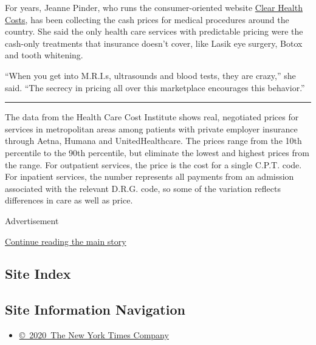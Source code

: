 For years, Jeanne Pinder, who runs the consumer-oriented website
\href{https://clearhealthcosts.com/}{Clear Health Costs}, has been
collecting the cash prices for medical procedures around the country.
She said the only health care services with predictable pricing were the
cash-only treatments that insurance doesn't cover, like Lasik eye
surgery, Botox and tooth whitening.

``When you get into M.R.I.s, ultrasounds and blood tests, they are
crazy,'' she said. ``The secrecy in pricing all over this marketplace
encourages this behavior.''

\begin{center}\rule{0.5\linewidth}{\linethickness}\end{center}

The data from the Health Care Cost Institute shows real, negotiated
prices for services in metropolitan areas among patients with private
employer insurance through Aetna, Humana and UnitedHealthcare. The
prices range from the 10th percentile to the 90th percentile, but
eliminate the lowest and highest prices from the range. For outpatient
services, the price is the cost for a single C.P.T. code. For inpatient
services, the number represents all payments from an admission
associated with the relevant D.R.G. code, so some of the variation
reflects differences in care as well as price.

Advertisement

\protect\hyperlink{after-bottom}{Continue reading the main story}

\hypertarget{site-index}{%
\subsection{Site Index}\label{site-index}}

\hypertarget{site-information-navigation}{%
\subsection{Site Information
Navigation}\label{site-information-navigation}}

\begin{itemize}
\tightlist
\item
  \href{https://help.nytimes3xbfgragh.onion/hc/en-us/articles/115014792127-Copyright-notice}{©~2020~The
  New York Times Company}
\end{itemize}

